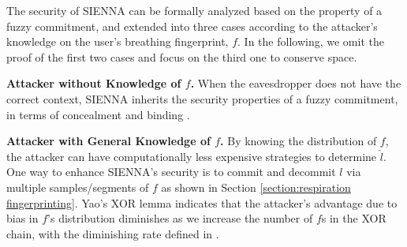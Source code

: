 The security of SIENNA can be formally analyzed based on the property of a fuzzy commitment, and extended into three cases according to the attacker's knowledge on the user's breathing fingerprint, $f$. In the following, we omit the proof of the first two cases and focus on the third one to conserve space.

{\bf Attacker without Knowledge of $f$.} When the eavesdropper does not have the correct context, SIENNA inherits the security properties of a fuzzy commitment, in terms of concealment and binding \cite{JuelsFuzzyCommitmentScheme1999}.


{\bf Attacker with General Knowledge of $f$.} 
By knowing the distribution of $f$, the attacker can have computationally less expensive strategies to determine $\hat{l}$. One way to enhance SIENNA's security is to commit and decommit $l$ via multiple samples/segments of $f$ as shown in Section \ref{section:respiration fingerprinting}. Yao's XOR lemma \cite{GoldreichYaoXORlemma2011} indicates that the attacker's advantage due to bias in $f$'s distribution diminishes as we increase the number of $f$s in the XOR chain, with the diminishing rate defined in \cite{GoldreichYaoXORlemma2011}.



